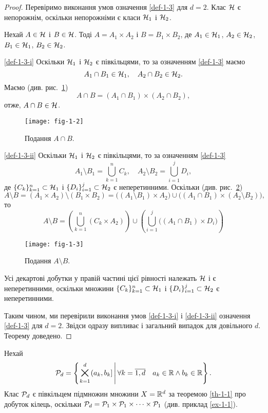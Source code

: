\begin{proof}
	Перевіримо виконання умов означення \ref{def-1-3} для $d=2$. Клас $\mathcal H$ є непорожнім, оскільки непорожніми є класи $\mathcal H_1$ і $\mathcal H_2$.
	
	
	Нехай $A\in\mathcal H$ і $B\in\mathcal H$. Тоді $A=A_1\times A_2$ і $B=B_1\times B_2$, де $A_1\in\mathcal H_1$, $A_2\in\mathcal H_2$, $B_1\in\mathcal H_1$, $B_2\in\mathcal H_2$. 
	
	\ref{def-1-3-i}
	Оскільки $\mathcal H_1$ і $\mathcal H_2$ є півкільцями, то за означенням \ref{def-1-3} маємо
	$$
	A_1\cap B_1\in\mathcal H_1, \quad A_2\cap B_2\in\mathcal H_2. 
	$$
	Маємо (див. рис.~\ref{fig-1-2})
	$$
	A\cap B= (A_1\cap B_1)\times (A_2\cap B_2),
	$$
	отже, $A\cap B\in\mathcal H$.

\begin{figure}[!h]
	\centering
	\texttt{[image: fig-1-2]}
	\caption{Подання $A\cap B$.}
	\label{fig-1-2}
\end{figure}	
	
	\ref{def-1-3-ii}
	Оскільки $\mathcal H_1$ і $\mathcal H_2$ є півкільцями, то за означенням \ref{def-1-3}
	$$
	A_1\setminus B_1=\bigcup_{k=1}^n C_k, \quad A_2\setminus B_2=\bigcup_{i=1}^j D_i, 
	$$
	де $\{C_k\}_{k=1}^n\subset \mathcal H_1$ і $\{D_i\}_{i=1}^j\subset \mathcal H_2$ є неперетинними. Оскільки (див. рис.~\ref{fig-1-3})
	$$
	A\setminus B = (A_1\times A_2)\setminus(B_1\times B_2) = \big((A_1\setminus B_1)\times A_2\big)\cup \big((A_1\cap B_1)\times (A_2\setminus B_2)\big),
	$$
	то
	$$
	A\setminus B = \left(\bigcup_{k=1}^n (C_k\times A_2) \right) \cup \left(\bigcup_{i=1}^j \big((A_1\cap B_1)\times D_i\big) \right)
	$$
\begin{figure}[!h]
	\centering
	\texttt{[image: fig-1-3]}
	\caption{Подання $A\setminus B$.}
	\label{fig-1-3}
\end{figure}
	Усі декартові добутки у правій частині цієї рівності належать $\mathcal H$ і є неперетинними, оскільки множини $\{C_k\}_{k=1}^n\subset \mathcal H_1$ і $\{D_i\}_{i=1}^j\subset \mathcal H_2$ є неперетинними.
	
	Таким чином, ми перевірили виконання умов \ref{def-1-3-i} і \ref{def-1-3-ii} означення 	\ref{def-1-3} для $d=2$. Звідси одразу випливає і загальний випадок для довільного $d$. Теорему доведено.
\end{proof}

\begin{example}
	\label{ex-1-5}
	Нехай
	$$
	\PP_d=\left\{\bigtimes_{k=1}^d(a_k,b_k] \midd \forall k=\overline{1,d}\quad a_k\in\R \land b_k\in\R\right\}.
	$$
	Клас $\mathcal P_d$ є півкільцем підмножин множини $X={\mathbb R}^d$ за теоремою \ref{th-1-1} про добуток кілець, оскільки $\mathcal P_d=\mathcal P_1\times\mathcal P_1\times \cdots \times \mathcal P_1$ (див. приклад \ref{ex-1-1}).
\end{example}

